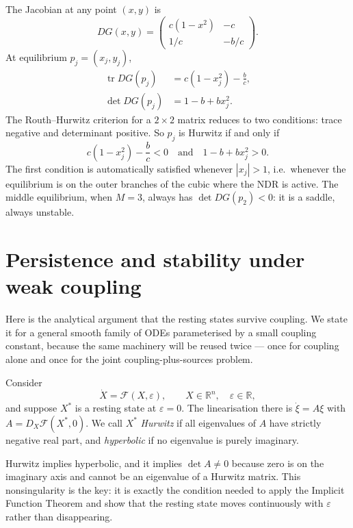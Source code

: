 \documentclass[11pt]{article}
\begin{document}
The Jacobian at any point $(x,y)$ is
\begin{equation}
  DG(x,y)
  =
  \begin{pmatrix}
    c(1-x^2) & -c \\
    1/c & -b/c
  \end{pmatrix}.
  \label{eq:jacobian}
\end{equation}
At equilibrium $p_j = (x_j,y_j)$,
\begin{align}
  \operatorname{tr} DG(p_j)
  &= c(1-x_j^2) - \frac{b}{c},
  \label{eq:trace}\\
  \det DG(p_j)
  &= 1 - b + bx_j^2.
  \label{eq:det}
\end{align}
The Routh--Hurwitz criterion for a $2\times 2$ matrix reduces to two
conditions: trace negative and determinant positive. So $p_j$ is Hurwitz
if and only if
\begin{equation}
  c(1-x_j^2) - \frac{b}{c} < 0
  \quad\text{and}\quad
  1 - b + bx_j^2 > 0.
  \label{eq:hurwitz_conds}
\end{equation}
The first condition is automatically satisfied whenever $|x_j| > 1$,
i.e.\ whenever the equilibrium is on the outer branches of the cubic
where the NDR is active. The middle equilibrium, when $M = 3$, always
has $\det DG(p_2) < 0$: it is a saddle, always unstable.


\section{Persistence and stability under weak coupling}
\label{sec:general}


Here is the analytical argument that the resting states survive
coupling. We state it for a general smooth family of ODEs parameterised
by a small coupling constant, because the same machinery will be reused
twice --- once for coupling alone and once for the joint
coupling-plus-sources problem.

Consider
\begin{equation}
  \dot X = \mathcal{F}(X,\varepsilon),
  \qquad X \in \mathbb{R}^n,\quad \varepsilon \in \mathbb{R},
  \label{eq:gen_system}
\end{equation}
and suppose $X^*$ is a resting state at $\varepsilon = 0$. The
linearisation there is $\dot\xi = A\xi$ with $A = D_X\mathcal{F}(X^*,0)$.
We call $X^*$ \emph{Hurwitz} if all eigenvalues of $A$ have strictly
negative real part, and \emph{hyperbolic} if no eigenvalue is purely
imaginary.

Hurwitz implies hyperbolic, and it implies $\det A \neq 0$ because zero
is on the imaginary axis and cannot be an eigenvalue of a Hurwitz
matrix. This nonsingularity is the key: it is exactly the condition
needed to apply the Implicit Function Theorem and show that the resting
state moves continuously with $\varepsilon$ rather than disappearing.
\end{document}
